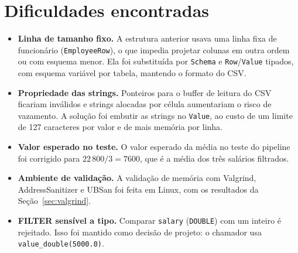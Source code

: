 \documentclass[11pt,a4paper]{article}
\begin{document}
\section{Dificuldades encontradas}
\begin{itemize}
    \item \textbf{Linha de tamanho fixo.} A estrutura anterior usava uma linha fixa de funcionário (\texttt{EmployeeRow}), o que impedia projetar colunas em outra ordem ou com esquema menor. Ela foi substituída por \texttt{Schema} e \texttt{Row}/\texttt{Value} tipados, com esquema variável por tabela, mantendo o formato do CSV.
    \item \textbf{Propriedade das strings.} Ponteiros para o buffer de leitura do CSV ficariam inválidos e strings alocadas por célula aumentariam o risco de vazamento. A solução foi embutir as strings no \texttt{Value}, ao custo de um limite de 127 caracteres por valor e de mais memória por linha.
    \item \textbf{Valor esperado no teste.} O valor esperado da média no teste do pipeline foi corrigido para $22\,800 / 3 = 7600$, que é a média dos três salários filtrados.
    \item \textbf{Ambiente de validação.} A validação de memória com Valgrind, AddressSanitizer e UBSan foi feita em Linux, com os resultados da Seção~\ref{sec:valgrind}.
    \item \textbf{FILTER sensível a tipo.} Comparar \texttt{salary} (\texttt{DOUBLE}) com um inteiro é rejeitado. Isso foi mantido como decisão de projeto: o chamador usa \texttt{value\_double(5000.0)}.
\end{itemize}
\end{document}
